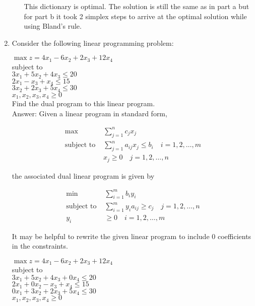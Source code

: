 \documentclass{article}
\begin{document}
\begin{enumerate}
\begin{enumerate}[a)]
This dictionary is optimal. The solution is still the same as in part a but for part b it took 2 simplex steps to arrive at the optimal solution while using Bland's rule. 


\end{enumerate}

\newpage
\item

Consider the following linear programming problem:

$\max z = 4x_1 -6x_2 + 2x_3 + 12x_4$\\
subject to \\
$3x_1 + 5x_2 + 4x_3 \leq 20$\\
$2x_1 -x_3 + x_4 \leq 15$ \\
$3x_2 + 2x_3 + 5x_4 \leq 30$\\
$x_1, x_2, x_3, x_4 \geq 0$\\

Find the dual program to this linear program.\\

Answer: Given a linear program in standard form,

\begin{align*}
\max  & \sum_{j=1}^n c_j x_j \\
\text{subject to }  & \sum_{j=1}^n a_{ij}x_j \leq b_i \quad  i = 1,2,\dots ,m \\
& x_j \geq 0  \quad j = 1,2,\dots , n
\end{align*}

the associated dual linear program is given by

\begin{align*}
\min & \sum_{i=1}^m b_iy_i \\
\text{subject to } & \sum_{i=1}^m y_i a_{ij} \geq c_j \quad j = 1,2,\dots , n \\
y_i & \geq 0 \quad i= 1,2,\dots , m
\end{align*}

It may be helpful to rewrite the given linear program to include 0 coefficients in the constraints.

$\max z = 4x_1 -6x_2 + 2x_3 + 12x_4$\\
subject to \\
$3x_1 + 5x_2 + 4x_3  + 0x_4\leq 20$\\
$2x_1 + 0 x_2 - x_3 + x_4 \leq 15$ \\
$0x_1 + 3x_2 + 2x_3 + 5x_4 \leq 30$\\
$x_1, x_2, x_3, x_4 \geq 0$\\


\end{enumerate}
\end{document}
